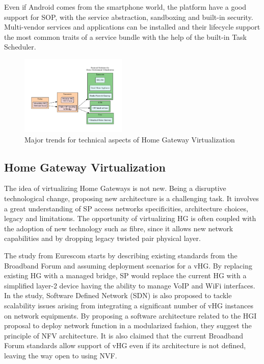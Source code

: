 Even if Android comes from the smartphone world, the platform have a good support for SOP, with the service abstraction, sandboxing and built-in security. Multi-vendor services and applications can be installed and their lifecycle support the most common traits of a service bundle with the help of the built-in Task Scheduler.


\begin{figure}
  \begin{center}
    \includegraphics[width=0.45\textwidth]{fig/vhgtrends.pdf}
  \end{center}
  \caption{ Major trends for technical aspects of Home Gateway Virtualization
    \label{fig:trends}
  }
\end{figure}


\subsection{Home Gateway Virtualization}
The idea of virtualizing Home Gateways is not new.
Being a disruptive technological change, proposing new architecture is a challenging task.
It involves a great understanding of SP access networks specificities, architecture choices, legacy and limitations.
The opportunity of virtualizing HG is often coupled with the adoption of new technology such as fibre, since it allows new network capabilities and by dropping legacy twisted pair physical layer.

The study from Eurescom \cite{daniel_abgrall_virtual_????} starts by describing existing standards from the Broadband Forum and assuming deployment scenarios for a vHG.
By replacing existing HG with a managed bridge, SP would replace the current HG with a simplified layer-2 device having the ability to manage VoIP and WiFi interfaces.
In the study, Software Defined Network (SDN) is also proposed to tackle scalability issues arising from integrating a significant number of vHG instances on network equipments.
By proposing a software architecture related to the HGI proposal to deploy network function in a modularized fashion, they suggest the principle of NFV architecture.
It is also claimed that the current Broadband Forum standards allow support of vHG even if its architecture is not defined, leaving the way open to using NVF.

